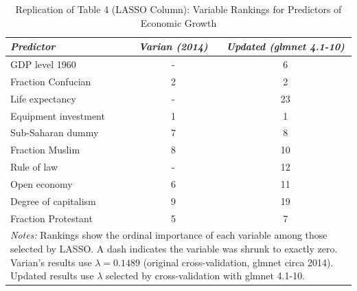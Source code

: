 \begin{table}[h]
\centering
\caption{Replication of Table 4 (LASSO Column): Variable Rankings for Predictors of Economic Growth}
\label{tab:main}
\begin{tabular}{lcc}
\hline
\textit{Predictor} & \textit{Varian (2014)} & \textit{Updated (glmnet 4.1-10)} \\
\hline
GDP level 1960 & - & 6 \\
Fraction Confucian & 2 & 2 \\
Life expectancy & - & 23 \\
Equipment investment & 1 & 1 \\
Sub-Saharan dummy & 7 & 8 \\
Fraction Muslim & 8 & 10 \\
Rule of law & - & 12 \\
Open economy & 6 & 11 \\
Degree of capitalism & 9 & 19 \\
Fraction Protestant & 5 & 7 \\
\hline
\multicolumn{3}{p{0.85\textwidth}}{\small \textit{Notes:} Rankings show the ordinal importance of each variable among those selected by LASSO. A dash indicates the variable was shrunk to exactly zero. Varian's results use $\lambda = 0.1489$ (original cross-validation, glmnet circa 2014). Updated results use $\lambda$ selected by cross-validation with glmnet 4.1-10.}
\end{tabular}
\end{table}
